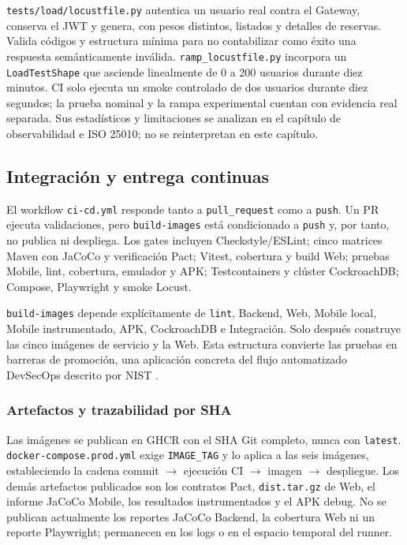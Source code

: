 \texttt{tests/load/locustfile.py} autentica un usuario real contra el Gateway,
conserva el JWT y genera, con pesos distintos, listados y detalles de reservas.
Valida códigos y estructura mínima para no contabilizar como éxito una respuesta
semánticamente inválida. \texttt{ramp\_locustfile.py} incorpora un
\texttt{LoadTestShape} que asciende linealmente de 0 a 200 usuarios durante diez
minutos. CI solo ejecuta un smoke controlado de dos usuarios durante diez
segundos; la prueba nominal y la rampa experimental cuentan con evidencia real
separada. Sus estadísticos y limitaciones se analizan en el capítulo de
observabilidad e ISO 25010; no se reinterpretan en este capítulo.

\subsection{Integración y entrega continuas}
\label{subsec:ci-cd}

El workflow \texttt{ci-cd.yml} responde tanto a \texttt{pull\_request} como a
\texttt{push}. Un PR ejecuta validaciones, pero \texttt{build-images} está
condicionado a \texttt{push} y, por tanto, no publica ni despliega. Los gates
incluyen Checkstyle/ESLint; cinco matrices Maven con JaCoCo y verificación Pact;
Vitest, cobertura y build Web; pruebas Mobile, lint, cobertura, emulador y APK;
Testcontainers y clúster CockroachDB; Compose, Playwright y smoke Locust.

\texttt{build-images} depende explícitamente de \texttt{lint}, Backend, Web,
Mobile local, Mobile instrumentado, APK, CockroachDB e Integración. Solo después
construye las cinco imágenes de servicio y la Web. Esta estructura convierte las
pruebas en barreras de promoción, una aplicación concreta del flujo automatizado
DevSecOps descrito por NIST \cite{chandramouli2022nistdevsecops}.

\subsubsection{Artefactos y trazabilidad por SHA}

Las imágenes se publican en GHCR con el SHA Git completo, nunca con
\texttt{latest}. \texttt{docker-compose.prod.yml} exige \texttt{IMAGE\_TAG} y lo
aplica a las seis imágenes, estableciendo la cadena
commit $\rightarrow$ ejecución CI $\rightarrow$ imagen $\rightarrow$ despliegue.
Los demás artefactos publicados son los contratos Pact, \texttt{dist.tar.gz} de
Web, el informe JaCoCo Mobile, los resultados instrumentados y el APK debug. No
se publican actualmente los reportes JaCoCo Backend, la cobertura Web ni un
reporte Playwright; permanecen en los logs o en el espacio temporal del runner.


